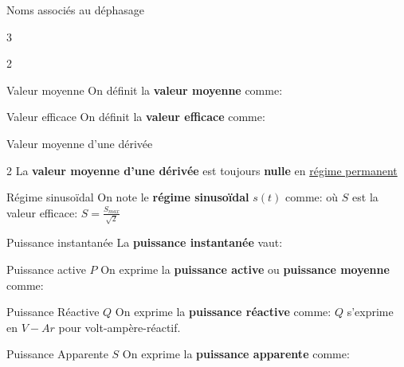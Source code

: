 \documentclass{article} %
\begin{document}
{\begin{vocabulaire}{Noms associés au déphasage}
\begin{multicols}{3}
\end{multicols}
\end{vocabulaire}
\pagebreak
\begin{multicols}{2}
\begin{definition}{Valeur moyenne}
On définit la \textbf{valeur moyenne} comme:
\end{definition}
\begin{definition}[label=val_eff]{Valeur efficace}
On définit la \textbf{valeur efficace} comme:
\end{definition}
\end{multicols}
\begin{propriété}{Valeur moyenne d'une dérivée}
\begin{multicols}{2}
La \textbf{valeur moyenne d'une dérivée} est toujours \textbf{nulle} en \underline{régime permanent} 
\end{multicols}
\end{propriété}
\begin{definition}{Régime sinusoïdal}
On note le \textbf{régime sinusoïdal} $s(t)$ comme:
où $S$ est la valeur efficace: $S=\frac{S_{max}}{\sqrt{2}}$
\end{definition}
{}
\begin{definition}{Puissance instantanée}
La \textbf{puissance instantanée} vaut:
\end{definition}
\begin{definition}{Puissance active $P$}
On exprime la \textbf{puissance active} ou \textbf{puissance moyenne} comme:
\end{definition}
\begin{definition}{Puissance Réactive $Q$}
On exprime la \textbf{puissance réactive} comme:
$Q$ s'exprime en $V-Ar$ pour volt-ampère-réactif.
\end{definition}
\begin{definition}{Puissance Apparente $S$}
On exprime la \textbf{puissance apparente} comme:
\end{definition}\pagebreak
{}
{}
}
\end{document}
